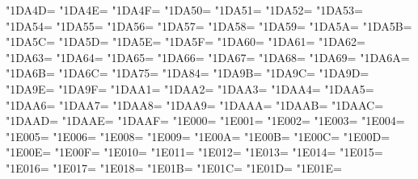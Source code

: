 \XeTeXcharclass"1DA4D=\KclassCM
\XeTeXcharclass"1DA4E=\KclassCM
\XeTeXcharclass"1DA4F=\KclassCM
\XeTeXcharclass"1DA50=\KclassCM
\XeTeXcharclass"1DA51=\KclassCM
\XeTeXcharclass"1DA52=\KclassCM
\XeTeXcharclass"1DA53=\KclassCM
\XeTeXcharclass"1DA54=\KclassCM
\XeTeXcharclass"1DA55=\KclassCM
\XeTeXcharclass"1DA56=\KclassCM
\XeTeXcharclass"1DA57=\KclassCM
\XeTeXcharclass"1DA58=\KclassCM
\XeTeXcharclass"1DA59=\KclassCM
\XeTeXcharclass"1DA5A=\KclassCM
\XeTeXcharclass"1DA5B=\KclassCM
\XeTeXcharclass"1DA5C=\KclassCM
\XeTeXcharclass"1DA5D=\KclassCM
\XeTeXcharclass"1DA5E=\KclassCM
\XeTeXcharclass"1DA5F=\KclassCM
\XeTeXcharclass"1DA60=\KclassCM
\XeTeXcharclass"1DA61=\KclassCM
\XeTeXcharclass"1DA62=\KclassCM
\XeTeXcharclass"1DA63=\KclassCM
\XeTeXcharclass"1DA64=\KclassCM
\XeTeXcharclass"1DA65=\KclassCM
\XeTeXcharclass"1DA66=\KclassCM
\XeTeXcharclass"1DA67=\KclassCM
\XeTeXcharclass"1DA68=\KclassCM
\XeTeXcharclass"1DA69=\KclassCM
\XeTeXcharclass"1DA6A=\KclassCM
\XeTeXcharclass"1DA6B=\KclassCM
\XeTeXcharclass"1DA6C=\KclassCM
\XeTeXcharclass"1DA75=\KclassCM
\XeTeXcharclass"1DA84=\KclassCM
\XeTeXcharclass"1DA9B=\KclassCM
\XeTeXcharclass"1DA9C=\KclassCM
\XeTeXcharclass"1DA9D=\KclassCM
\XeTeXcharclass"1DA9E=\KclassCM
\XeTeXcharclass"1DA9F=\KclassCM
\XeTeXcharclass"1DAA1=\KclassCM
\XeTeXcharclass"1DAA2=\KclassCM
\XeTeXcharclass"1DAA3=\KclassCM
\XeTeXcharclass"1DAA4=\KclassCM
\XeTeXcharclass"1DAA5=\KclassCM
\XeTeXcharclass"1DAA6=\KclassCM
\XeTeXcharclass"1DAA7=\KclassCM
\XeTeXcharclass"1DAA8=\KclassCM
\XeTeXcharclass"1DAA9=\KclassCM
\XeTeXcharclass"1DAAA=\KclassCM
\XeTeXcharclass"1DAAB=\KclassCM
\XeTeXcharclass"1DAAC=\KclassCM
\XeTeXcharclass"1DAAD=\KclassCM
\XeTeXcharclass"1DAAE=\KclassCM
\XeTeXcharclass"1DAAF=\KclassCM
\XeTeXcharclass"1E000=\KclassCM
\XeTeXcharclass"1E001=\KclassCM
\XeTeXcharclass"1E002=\KclassCM
\XeTeXcharclass"1E003=\KclassCM
\XeTeXcharclass"1E004=\KclassCM
\XeTeXcharclass"1E005=\KclassCM
\XeTeXcharclass"1E006=\KclassCM
\XeTeXcharclass"1E008=\KclassCM
\XeTeXcharclass"1E009=\KclassCM
\XeTeXcharclass"1E00A=\KclassCM
\XeTeXcharclass"1E00B=\KclassCM
\XeTeXcharclass"1E00C=\KclassCM
\XeTeXcharclass"1E00D=\KclassCM
\XeTeXcharclass"1E00E=\KclassCM
\XeTeXcharclass"1E00F=\KclassCM
\XeTeXcharclass"1E010=\KclassCM
\XeTeXcharclass"1E011=\KclassCM
\XeTeXcharclass"1E012=\KclassCM
\XeTeXcharclass"1E013=\KclassCM
\XeTeXcharclass"1E014=\KclassCM
\XeTeXcharclass"1E015=\KclassCM
\XeTeXcharclass"1E016=\KclassCM
\XeTeXcharclass"1E017=\KclassCM
\XeTeXcharclass"1E018=\KclassCM
\XeTeXcharclass"1E01B=\KclassCM
\XeTeXcharclass"1E01C=\KclassCM
\XeTeXcharclass"1E01D=\KclassCM
\XeTeXcharclass"1E01E=\KclassCM
